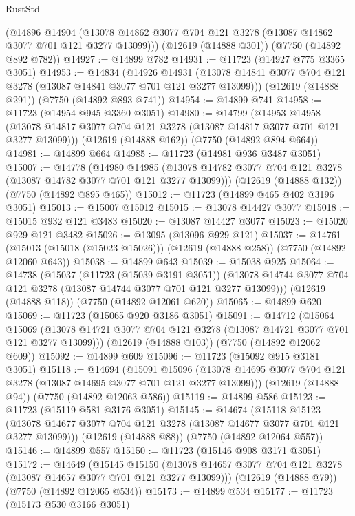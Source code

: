 \begin{lexlean}{RustStd}
\begin{coremodule}
    (@14896
      @14904
      (@13078 @14862 @3077 @704 @121 @3278 (@13087 @14862 @3077 @701 @121 @3277 @13099)))
    (@12619 (@14888 @301))
    (@7750 (@14892 @892 @782))
@14927 := @14899 @782
@14931 := @11723 (@14927 @775 @3365 @3051)
@14953 := @14834
    (@14926
      @14931
      (@13078 @14841 @3077 @704 @121 @3278 (@13087 @14841 @3077 @701 @121 @3277 @13099)))
    (@12619 (@14888 @291))
    (@7750 (@14892 @893 @741))
@14954 := @14899 @741
@14958 := @11723 (@14954 @945 @3360 @3051)
@14980 := @14799
    (@14953
      @14958
      (@13078 @14817 @3077 @704 @121 @3278 (@13087 @14817 @3077 @701 @121 @3277 @13099)))
    (@12619 (@14888 @162))
    (@7750 (@14892 @894 @664))
@14981 := @14899 @664
@14985 := @11723 (@14981 @936 @3487 @3051)
@15007 := @14778
    (@14980
      @14985
      (@13078 @14782 @3077 @704 @121 @3278 (@13087 @14782 @3077 @701 @121 @3277 @13099)))
    (@12619 (@14888 @132))
    (@7750 (@14892 @895 @465))
@15012 := @11723 (@14899 @465 @402 @3196 @3051)
@15013 := @15007 @15012
@15015 := @13078 @14427 @3077
@15018 := @15015 @932 @121 @3483
@15020 := @13087 @14427 @3077
@15023 := @15020 @929 @121 @3482
@15026 := @13095 (@13096 @929 @121)
@15037 := @14761
    (@15013 (@15018 (@15023 @15026)))
    (@12619 (@14888 @258))
    (@7750 (@14892 @12060 @643))
@15038 := @14899 @643
@15039 := @15038 @925
@15064 := @14738
    (@15037
      (@11723 (@15039 @3191 @3051))
      (@13078 @14744 @3077 @704 @121 @3278 (@13087 @14744 @3077 @701 @121 @3277 @13099)))
    (@12619 (@14888 @118))
    (@7750 (@14892 @12061 @620))
@15065 := @14899 @620
@15069 := @11723 (@15065 @920 @3186 @3051)
@15091 := @14712
    (@15064
      @15069
      (@13078 @14721 @3077 @704 @121 @3278 (@13087 @14721 @3077 @701 @121 @3277 @13099)))
    (@12619 (@14888 @103))
    (@7750 (@14892 @12062 @609))
@15092 := @14899 @609
@15096 := @11723 (@15092 @915 @3181 @3051)
@15118 := @14694
    (@15091
      @15096
      (@13078 @14695 @3077 @704 @121 @3278 (@13087 @14695 @3077 @701 @121 @3277 @13099)))
    (@12619 (@14888 @94))
    (@7750 (@14892 @12063 @586))
@15119 := @14899 @586
@15123 := @11723 (@15119 @581 @3176 @3051)
@15145 := @14674
    (@15118
      @15123
      (@13078 @14677 @3077 @704 @121 @3278 (@13087 @14677 @3077 @701 @121 @3277 @13099)))
    (@12619 (@14888 @88))
    (@7750 (@14892 @12064 @557))
@15146 := @14899 @557
@15150 := @11723 (@15146 @908 @3171 @3051)
@15172 := @14649
    (@15145
      @15150
      (@13078 @14657 @3077 @704 @121 @3278 (@13087 @14657 @3077 @701 @121 @3277 @13099)))
    (@12619 (@14888 @79))
    (@7750 (@14892 @12065 @534))
@15173 := @14899 @534
@15177 := @11723 (@15173 @530 @3166 @3051)

\end{coremodule}
\end{lexlean}
